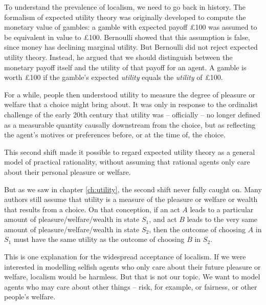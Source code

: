 To understand the prevalence of localism, we need to go back in
history. The formalism of expected utility theory was originally
developed to compute the monetary value of gambles: a gamble with
expected payoff £100 was assumed to be equivalent in value to £100.
Bernoulli showed that this assumption is false, since money has
declining marginal utility. But Bernoulli did not reject expected
utility theory. Instead, he argued that we should distinguish between
the monetary payoff itself and the utility of that payoff for an
agent. A gamble is worth £100 if the gamble's expected \emph{utility}
equals the \emph{utility} of £100.

For a while, people then understood utility to measure the degree of
pleasure or welfare that a choice might bring about. It was only in
response to the ordinalist challenge of the early 20th century that
utility was -- officially -- no longer defined as a measurable
quantity causally downstream from the choice, but as reflecting the
agent's motives or preferences before, or at the time of, the choice.

This second shift made it possible to regard expected utility theory
as a general model of practical rationality, without assuming that
rational agents only care about their personal pleasure or welfare.

But as we saw in chapter \ref{ch:utility}, the second shift never
fully caught on. Many authors still assume that utility is a measure
of the pleasure or welfare or wealth that results from a choice. On
that conception, if an act $A$ leads to a particular amount of
pleasure/welfare/wealth in state $S_1$, and act $B$ leads to
the very same amount of pleasure/welfare/wealth in state $S_2$, then
the outcome of choosing $A$ in $S_1$ must have the same utility as the
outcome of choosing $B$ in $S_2$.

This is one explanation for the widespread acceptance of localism. If
we were interested in modelling selfish agents who only care about
their future pleasure or welfare, localism would be harmless. But that
is not our topic. We want to model agents who may care about other
things -- risk, for example, or fairness, or other people's welfare.


